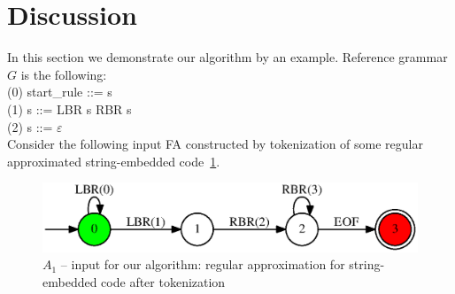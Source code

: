 \section{Discussion}
In this section we demonstrate our algorithm by an example. Reference grammar $G$ is the following:\\
(0) start\_rule ::= s \\
(1) s ::= LBR s RBR s\\
(2) s ::= $\varepsilon$ \\

Consider the following input FA constructed by tokenization of some regular approximated string-embedded code~\ref{faApprox}.
\begin{figure}
    \begin{center}
        \includegraphics[scale=0.5]{dot/in3.eps}
    \end{center}
    \caption{$A_1$ -- input for our algorithm: regular approximation for string-embedded code after tokenization} 
    \label{faApprox}
\end{figure}

